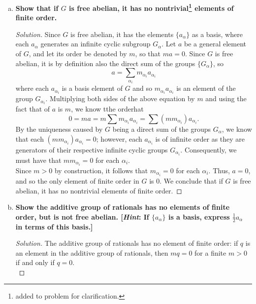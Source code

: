 \documentclass[11pt]{article}
\newenvironment{solution}
  {\renewcommand\qedsymbol{$\blacksquare$}\begin{proof}[Solution]}
  {\end{proof}}
\begin{document}
\begin{enumerate}[b)]
    \item \textbf{Show that if $G$ is free abelian, it has no nontrivial\footnote{added to problem for clarification.} elements of finite order.}
    
    \begin{solution}
    Since $G$ is free abelian, it has the elements $\{ a_\alpha \}$ as a basis, where each $a_\alpha$ generates an infinite cyclic subgroup $G_\alpha$. Let $a$ be a general element of $G$, and let its order be denoted by $m$, so that $ma = 0$. Since $G$
    is free abelian, it is by definition also the direct sum of the groups $\{ G_\alpha \}$, so 
    \[
        a = \sum_{\alpha_i} m_{\alpha_i} a_{\alpha_i} 
    \]
    where each $a_{\alpha_i}$ is a basis element of $G$ and so $m_{\alpha_i} a_{\alpha_i}$ is an element of the group $G_{\alpha_i}$. Multiplying both sides of the above equation by $m$ and using the fact that  of $a$ is $m$, we know tthe orderhat
    \[
        0 = ma = m \sum m_{\alpha_i} a_{\alpha_i} = \sum (mm_{\alpha_i}) a_{\alpha_i}.
    \]
    By the uniqueness caused by $G$ being a direct sum of the groups $G_\alpha$, we know that each $(mm_{\alpha_i}) a_{\alpha_i} = 0$; however, each $a_{\alpha_i}$ is of infinite order as they are generators of their respective infinite cyclic groups $G_{\alpha_i}$. 
    Consequently, we must have that $mm_{\alpha_i} = 0$ for each $\alpha_i$. \\

    Since $m > 0$ by construction, it follows that $m_{\alpha_i} = 0$ for each $\alpha_i$. Thus, $a = 0$, and so the only element of finite order in $G$ is $0$. We conclude that if $G$ is free abelian, it has no nontrivial elements of finite order.
    \end{solution}
    
    \item \textbf{Show the additive group of rationals has no elements of finite order, but is not free abelian. [\textit{Hint}: If $\{ a_\alpha \}$ is a basis, express $\frac{1}{2}a_\alpha$ in terms of this basis.]} 

    \begin{solution}
        The additive group of rationals has no element of finite order: if $q$ is an element in the additive group of rationals, then $mq = 0$ for a finite $m > 0$ if and only if $q = 0$. \\


\end{solution}
\end{enumerate}
\end{document}
